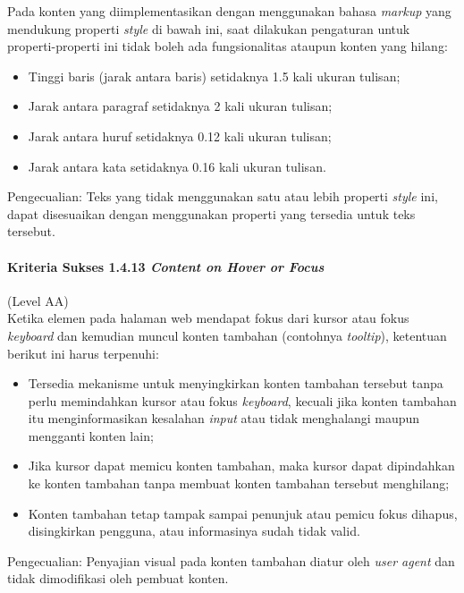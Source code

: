 Pada konten yang diimplementasikan dengan menggunakan bahasa \textit{markup} yang mendukung properti \textit{style} di bawah ini, saat dilakukan pengaturan untuk properti-properti ini tidak boleh ada fungsionalitas ataupun konten yang hilang:

\begin{itemize}
	\item Tinggi baris (jarak antara baris) setidaknya 1.5 kali ukuran tulisan;
	\item Jarak antara paragraf setidaknya 2 kali ukuran tulisan;
	\item Jarak antara huruf setidaknya 0.12 kali ukuran tulisan;
	\item Jarak antara kata setidaknya 0.16 kali ukuran tulisan.
\end{itemize}

Pengecualian: Teks yang tidak menggunakan satu atau lebih properti \textit{style} ini, dapat disesuaikan dengan menggunakan properti yang tersedia untuk teks tersebut.

\paragraph{Kriteria Sukses 1.4.13 \textit{Content on Hover or Focus}}
\label{sec:kriteria_sukses_1.4.13}
(Level AA)\\

Ketika elemen pada halaman web mendapat fokus dari kursor atau fokus \textit{keyboard} dan kemudian muncul konten tambahan (contohnya \textit{tooltip}), ketentuan berikut ini harus terpenuhi:

\begin{itemize}
	\item Tersedia mekanisme untuk menyingkirkan konten tambahan tersebut tanpa perlu memindahkan kursor atau fokus \textit{keyboard}, kecuali jika konten tambahan itu menginformasikan kesalahan \textit{input} atau tidak menghalangi maupun mengganti konten lain;
	\item Jika kursor dapat memicu konten tambahan, maka kursor dapat dipindahkan ke konten tambahan tanpa membuat konten tambahan tersebut menghilang;
	\item Konten tambahan tetap tampak sampai penunjuk atau pemicu fokus dihapus, disingkirkan pengguna, atau informasinya sudah tidak valid.
\end{itemize}

Pengecualian: Penyajian visual pada konten tambahan diatur oleh \textit{user agent} dan tidak dimodifikasi oleh pembuat konten.


